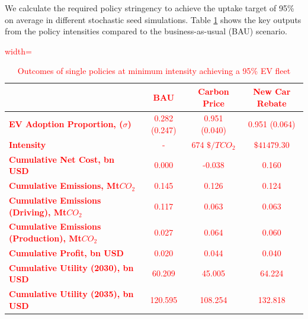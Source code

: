 \documentclass[12pt]{article}
\begin{document}
	We calculate the required policy stringency to achieve the uptake target of 95\% on average in different stochastic seed simulations. Table \ref{tab:policy_outcomes} shows the key outputs from the policy intensities compared to the business-as-usual (BAU) scenario.

    \textcolor{red}{
    \begin{table}[h!]
        \centering
        \caption{Outcomes of single policies at minimum intensity achieving a 95\% EV fleet}
        \label{tab:policy_outcomes}
        \begin{adjustbox}{width=\textwidth}
            \begin{tabular}{lccc}
                \toprule
                & \textbf{BAU} & \textbf{Carbon Price} & \textbf{New Car Rebate} \\
                \midrule
                \textbf{EV Adoption Proportion, ($\sigma$)} & 0.282 (0.247) & 0.951 (0.040) & 0.951 (0.064) \\
                \textbf{Intensity} & - & 674 $\$/TCO_2$ & $\$41479.30$ \\
                \textbf{Cumulative Net Cost, bn USD} & 0.000 & -0.038 & 0.160 \\
                \textbf{Cumulative Emissions, Mt$CO_2$} & 0.145 & 0.126 & 0.124 \\
                \textbf{Cumulative Emissions (Driving), Mt$CO_2$} & 0.117 & 0.063 & 0.063 \\
                \textbf{Cumulative Emissions (Production), Mt$CO_2$} & 0.027 & 0.064 & 0.060 \\
                \textbf{Cumulative Profit, bn USD} & 0.020 & 0.044 & 0.040 \\
                \textbf{Cumulative Utility (2030), bn USD} & 60.209 & 45.005 & 64.224 \\
                \textbf{Cumulative Utility (2035), bn USD} & 120.595 & 108.254 & 132.818 \\
                \bottomrule
            \end{tabular}
        \end{adjustbox}
    \end{table}}
\end{document}
